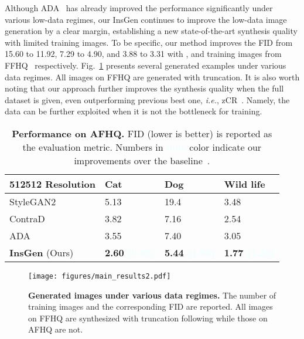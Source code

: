 \documentclass{article}
\begin{document}
Although ADA~\cite{karras2020training} has already improved the performance significantly under various low-data regimes, our
InsGen continues to improve the low-data image generation by a clear margin, establishing a new state-of-the-art synthesis quality with limited training images. To be specific, our method improves the FID from 15.60 to 11.92, 7.29 to 4.90, and 3.88 to 3.31 with ,  and  training images from FFHQ~\cite{karras2019style} respectively. Fig.~\ref{fig:main_results} presents several generated examples under various data regimes. All images on FFHQ are generated with truncation. It is also worth noting that our approach further improves the synthesis quality when the full dataset is given, even outperforming previous best one, \textit{i.e.}, zCR~\cite{zhao2020improved}. Namely, the data can be further exploited when it is not the bottleneck for training.


\setlength{\tabcolsep}{15pt}
\begin{table}[t]
    \centering
    \caption{
        \textbf{Performance on AFHQ.}
FID (lower is better) is reported as the evaluation metric.
Numbers in \textbf{\textcolor{azure}{blue}} color indicate our improvements over the baseline~\cite{karras2020training}.
    }
    \label{table:sota-afhq}
    \vspace{0pt}
        \begin{tabular}{llll}
        \toprule
        512512 Resolution                     & Cat    &  Dog   & Wild life  \\
        \midrule
        StyleGAN2~\cite{karras2019style}              & 5.13   & 19.4   & 3.48 \\
        ContraD~\cite{jeong2021training}              & 3.82   & 7.16   & 2.54 \\
        ADA~\cite{karras2020training}                 & 3.55   & 7.40   & 3.05 \\
        \midrule
        \textbf{InsGen} (Ours) & \textbf{2.60 \textcolor{azure}{(0.95)}}  & \textbf{5.44 \textcolor{azure}{(1.96)}}  & \textbf{1.77 \textcolor{azure}{(1.28)}} \\
        \bottomrule
    \end{tabular}
    \vspace{-5pt}
\end{table}


\begin{figure}[t]
	\centering
	\texttt{[image: figures/main\_results2.pdf]}
	\vspace{-10pt}
	\caption{
	    \textbf{Generated images under various data regimes.}
The number of training images and the corresponding FID are reported.
All images on FFHQ are synthesized with truncation following \cite{karras2020training} while those on AFHQ are not.
	}
    \label{fig:main_results}
    \vspace{-8pt}
\end{figure}
\end{document}
